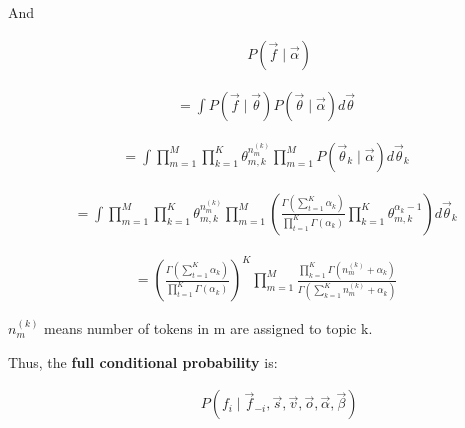 \documentclass{article}
\begin{document}

And 

\begin{equation}
\begin{aligned}
& \qquad P( \vec{f} \mid \vec{\alpha})
\end{aligned}
\end{equation}

\begin{equation}
\begin{aligned}
&= \int P(\vec{f} \mid \vec{\theta}) P(\vec{\theta}\mid\vec{\alpha}) d\vec{\theta}
\end{aligned}
\end{equation}

\begin{equation}
\begin{aligned}
&= \int \prod_{m=1}^{M} {\prod_{k=1}^{K}} \theta_{m,k}^{n_m^{(k)}} \prod_{m=1}^{M} P(\vec{\theta}_k \mid \vec{\alpha}) d\vec{\theta}_k
\end{aligned}
\end{equation}




\begin{equation}
\begin{aligned}
&= \int \prod_{m=1}^{M} {\prod_{k=1}^{K}} \theta_{m,k}^{n_m^{(k)}} \prod_{m=1}^{M} \left( 
\frac{\varGamma(\sum_{t=1}^{K} \alpha_k)}{\prod_{t=1}^{K}\varGamma(\alpha_k)}  \prod_{k=1}^{K} \theta_{m,k}^{\alpha_k -1} 
\right) d \vec{\theta}_k
\end{aligned}
\end{equation}

\begin{equation}
\begin{aligned}
&= \left( 
\frac{\varGamma(\sum_{t=1}^{K} \alpha_k)}{\prod_{t=1}^{K} \varGamma(\alpha_k)} 
\right)^K \prod_{m=1 }^{M} \frac{\prod_{k=1}^{K} \varGamma(n_m^{(k)}+\alpha_k)}{\varGamma(\sum_{k=1}^{K}n_m^{(k)}+\alpha_k)}
\end{aligned}
\end{equation}

$n_m^{(k)}$ means number of tokens in m are assigned to topic k.

\noindent Thus, the \textbf{full conditional probability} is:

\begin{equation}
\begin{aligned} \label{full_cpd}
& \qquad P(f_i \mid \vec{f}_{-i}, \vec{s}, \vec{v}, \vec{o}, \vec{\alpha}, \vec{\beta})
\end{aligned}
\end{equation}
\end{document}
